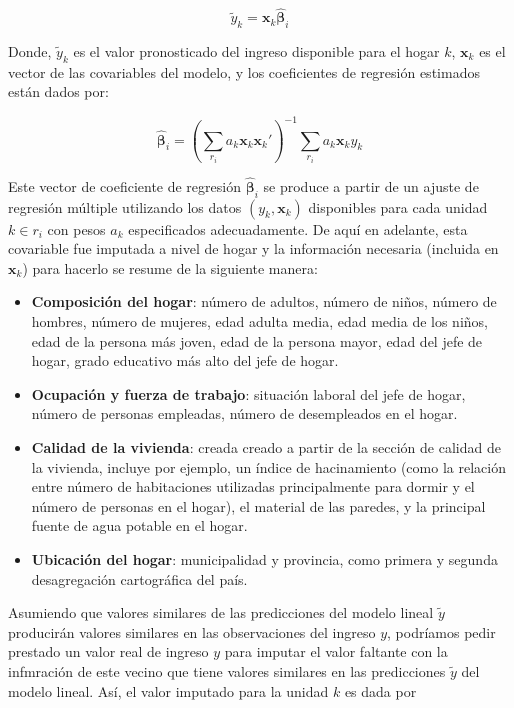 \documentclass[
  12pt,
  spanish,
]{book}
\providecommand{\tightlist}{%
  \setlength{\itemsep}{0pt}\setlength{\parskip}{0pt}}
\begin{document}
\[\tilde{y}_k = \mathbf{x}_k \hat{\boldsymbol{\beta}}_i\]

Donde, \(\tilde{y}_k\) es el valor pronosticado del ingreso disponible para el hogar \(k\), \(\mathbf{x}_k\) es el vector de las covariables del modelo, y los coeficientes de regresión estimados están dados por:

\[
\hat{\boldsymbol{\beta}}_i = (\sum_{r_i} a_k\mathbf{x}_k\mathbf{x}_k')^{-1}
\sum_{r_i} a_k\mathbf{x}_ky_k
\]

Este vector de coeficiente de regresión \(\hat{\boldsymbol{\beta}}_i\) se produce a partir de un ajuste de regresión múltiple utilizando los datos \((y_k, \mathbf{x}_k)\) disponibles para cada unidad \(k \in r_i\) con pesos \(a_k\) especificados adecuadamente. De aquí en adelante, esta covariable fue imputada a nivel de hogar y la información necesaria (incluida en \(\mathbf{x}_k\)) para hacerlo se resume de la siguiente manera:

\begin{itemize}
\tightlist
\item
  \textbf{Composición del hogar}: número de adultos, número de niños, número de hombres, número de mujeres, edad adulta media, edad media de los niños, edad de la persona más joven, edad de la persona mayor, edad del jefe de hogar, grado educativo más alto del jefe de hogar.
\item
  \textbf{Ocupación y fuerza de trabajo}: situación laboral del jefe de hogar, número de personas empleadas, número de desempleados en el hogar.
\item
  \textbf{Calidad de la vivienda}: creada creado a partir de la sección de calidad de la vivienda, incluye por ejemplo, un índice de hacinamiento (como la relación entre número de habitaciones utilizadas principalmente para dormir y el número de personas en el hogar), el material de las paredes, y la principal fuente de agua potable en el hogar.
\item
  \textbf{Ubicación del hogar}: municipalidad y provincia, como primera y segunda desagregación cartográfica del país.
\end{itemize}

Asumiendo que valores similares de las predicciones del modelo lineal \(\tilde y\) producirán valores similares en las observaciones del ingreso \(y\), podríamos pedir prestado un valor real de ingreso \(y\) para imputar el valor faltante con la infmración de este vecino que tiene valores similares en las predicciones \(\tilde y\) del modelo lineal. Así, el valor imputado para la unidad \(k\) es dada por
\end{document}

